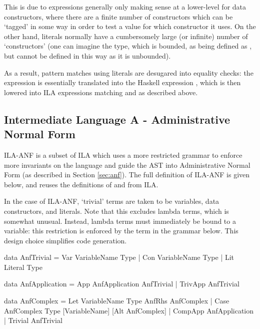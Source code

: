 \documentclass[dissertation.tex]{subfiles}
\begin{document}
{{{            This is due to  expressions generally only making sense at a lower-level for data constructors, where there are a finite number of constructors which can be `tagged' in some way in order to test a value for which constructor it uses. On the other hand, literals normally have a cumbersomely large (or infinite) number of `constructors' (one can imagine the  type, which is bounded, as being defined as , but  cannot be defined in this way as it is unbounded).
            
            As a result, pattern matches using literals are desugared into equality checks: the expression  is essentially translated into the Haskell expression , which is then lowered into ILA  expressions matching  and  as described above.

        }
    }
    \subsection{Intermediate Language A - Administrative Normal Form}
    {
        ILA-ANF is a subset of ILA which uses a more restricted grammar to enforce more invariants on the language and guide the AST into Administrative Normal Form (as described in Section \ref{sec:anf}). The full definition of ILA-ANF is given below, and reuses the definitions of  and  from ILA. 

        In the case of ILA-ANF, `trivial' terms are taken to be variables, data constructors, and literals. Note that this excludes lambda terms, which is somewhat unusual. Instead, lambda terms must immediately be bound to a variable: this restriction is enforced by the  term in the grammar below. This design choice simplifies code generation.

        \begin{haskellfigure}
        data AnfTrivial = Var VariableName Type
                        | Con VariableName Type
                        | Lit Literal Type

        data AnfApplication = App AnfApplication AnfTrivial
                            | TrivApp AnfTrivial

        data AnfComplex = Let VariableName Type AnfRhs AnfComplex
                        | Case AnfComplex Type [VariableName] [Alt AnfComplex]
                        | CompApp AnfApplication
                        | Trivial AnfTrivial


\end{haskellfigure}}}
\end{document}
